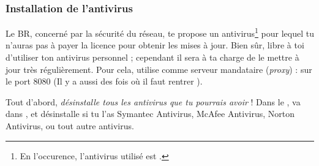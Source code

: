 



\subsubsection{Installation de l'antivirus}
\label{antivirus} Le BR, concerné par la sécurité du réseau, te propose un antivirus\footnote{En
l'occurence, l'antivirus utilisé est .} pour lequel tu n'auras pas à
payer la licence pour obtenir les mises à jour. Bien s\^{u}r, libre à toi d'utiliser ton antivirus
personnel ; cependant il sera à ta charge de le mettre à jour très régulièrement. Pour cela,
utilise comme serveur mandataire (\emph{proxy}) :  sur le port 8080 (Il y a aussi des fois o\`u il 
faut rentrer ).

Tout d'abord, \emph{désinstalle tous les antivirus que tu pourrais
avoir} ! Dans le , va dans ,  et
désinstalle si tu l'as Symantec Antivirus, McAfee Antivirus, Norton
Antivirus, ou tout autre antivirus.

